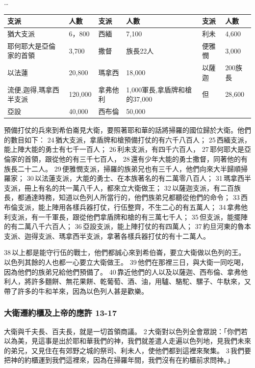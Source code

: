 \ldots 

\begin{table}[!hbp]
\centering
\begin{tabular}{|p{3cm}|p{1.5cm}||p{1.5cm}|p{3cm}||p{1.5cm}|p{1.5cm}|}\hline\hline
支派    &人數 & 支派    &人數   &支派    &人數   \\\hline\hline
猶大支派&6，800&西緬&7,100&利未& 4,600\\\hline
耶何耶大是亞倫家的首領&3,700&撒督&族長22人&便雅憫&3,000 \\\hline
以法蓮&20,800&瑪拿西&18,000&以薩迦&200族長 \\\hline
流便,迦得,瑪拿西半支派&120,000 &拿弗他利&1,000軍長,拿盾牌和槍的37,000 &但&28,600 \\\hline
亞設&40,000& 西布倫&50,000 & &  \\\hline
\end{tabular}
\end{table}

預備打仗的兵來到希伯崙見大衛，要照著耶和華的話將掃羅的國位歸於大衛。他們的數目如下： 24 猶大支派，拿盾牌和槍預備打仗的有六千八百人； 25 西緬支派，能上陣大能的勇士有七千一百人； 26 利未支派，有四千六百人， 27 耶何耶大是亞倫家的首領，跟從他的有三千七百人， 28 還有少年大能的勇士撒督，同著他的有族長二十二人。 29 便雅憫支派，掃羅的族弟兄也有三千人，他們向來大半歸順掃羅家； 30 以法蓮支派，大能的勇士、在本族著名的有二萬零八百人； 31 瑪拿西半支派，冊上有名的共一萬八千人，都來立大衛做王； 32 以薩迦支派，有二百族長，都通達時務，知道以色列人所當行的，他們族弟兄都聽從他們的命令； 33 西布倫支派，能上陣用各樣兵器打仗，行伍整齊，不生二心的有五萬人； 34 拿弗他利支派，有一千軍長，跟從他們拿盾牌和槍的有三萬七千人； 35 但支派，能擺陣的有二萬八千六百人； 36 亞設支派，能上陣打仗的有四萬人； 37 約旦河東的魯本支派、迦得支派、瑪拿西半支派，拿著各樣兵器打仗的有十二萬人。

38 以上都是能守行伍的戰士，他們都誠心來到希伯崙，要立大衛做以色列的王。以色列其餘的人也都一心要立大衛做王。 39 他們在那裡三日，與大衛一同吃喝，因為他們的族弟兄給他們預備了。 40 靠近他們的人以及以薩迦、西布倫、拿弗他利人，將許多麵餅、無花果餅、乾葡萄、酒、油，用驢、駱駝、騾子、牛馱來，又帶了許多的牛和羊來，因為以色列人甚是歡樂。


\subsubsection{大衛遷約櫃及上帝的應許 13-17 }
大衛與千夫長、百夫長，就是一切首領商議。 2 大衛對以色列全會眾說：「你們若以為美，見這事是出於耶和華我們的神，我們就差遣人走遍以色列地，見我們未來的弟兄，又見住在有郊野之城的祭司、利未人，使他們都到這裡來聚集。 3 我們要把神的約櫃運到我們這裡來，因為在掃羅年間，我們沒有在約櫃前求問神。」

